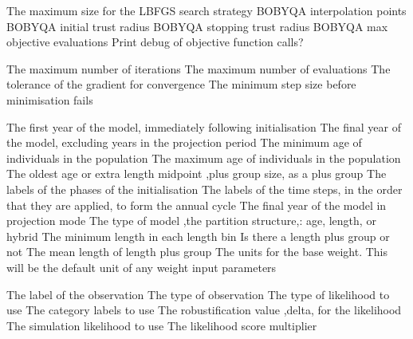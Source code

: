  {The maximum size for the LBFGS search strategy}
 {BOBYQA interpolation points}
 {BOBYQA initial trust radius}
 {BOBYQA stopping trust radius}
 {BOBYQA max objective evaluations}
 {Print debug of objective function calls?}
\par\textbf{}\par
{} {The maximum number of iterations}
 {The maximum number of evaluations}
 {The tolerance of the gradient for convergence}
 {The minimum step size before minimisation fails}
\par\par
{} {The first year of the model, immediately following initialisation}
 {The final year of the model, excluding years in the projection period}
 {The minimum age of individuals in the population}
 {The maximum age of individuals in the population}
 {The oldest age or extra length midpoint ,plus group size, as a plus group}
 {The labels of the phases of the initialisation}
 {The labels of the time steps, in the order that they are applied, to form the annual cycle}
 {The final year of the model in projection mode}
 {The type of model ,the partition structure,: age, length, or hybrid}
 {The minimum length in each length bin}
 {Is there a length plus group or not}
 {The mean length of length plus group}
 {The units for the base weight. This will be the default unit of any weight input parameters}
\par\par
{} {The label of the observation}
 {The type of observation}
 {The type of likelihood to use}
 {The category labels to use}
 {The robustification value ,delta, for the likelihood}
 {The simulation likelihood to use}
 {The likelihood score multiplier}
